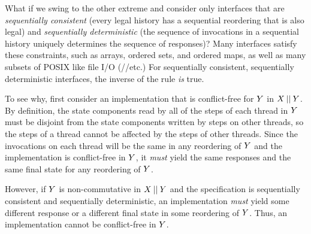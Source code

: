 What if we swing to the other extreme and consider only interfaces
that are \emph{sequentially consistent} (every legal history has a
sequential reordering that is also legal) and \emph{sequentially
  deterministic} (the sequence of invocations in a sequential history
uniquely determines the sequence of responses)?
%
Many interfaces satisfy these constraints, such as arrays, ordered
sets, and ordered maps, as well as many subsets of POSIX like file I/O
(//etc.)
%
For sequentially consistent, sequentially deterministic interfaces,
the inverse of
the rule \emph{is} true.
%

To see why, first consider an implementation that is conflict-free for
$Y$ in $X \mathbin{||} Y$.  By definition, the state components read
by all of the steps of each thread in $Y$ must be disjoint from the
state components written by steps on other threads, so the steps of a
thread cannot be affected by the steps of other threads.  Since the
invocations on each thread will be the same in any reordering of $Y$
and the implementation is conflict-free in $Y$, it \emph{must} yield
the same responses and the same final state for any reordering of
$Y$.

However, if $Y$ is non-\SIM commutative in $X \mathbin{||} Y$ and
the specification is sequentially consistent and sequentially
deterministic, an implementation \emph{must} yield some different
response or a different final state in some reordering of $Y$.
Thus, an implementation cannot be conflict-free in $Y$.


